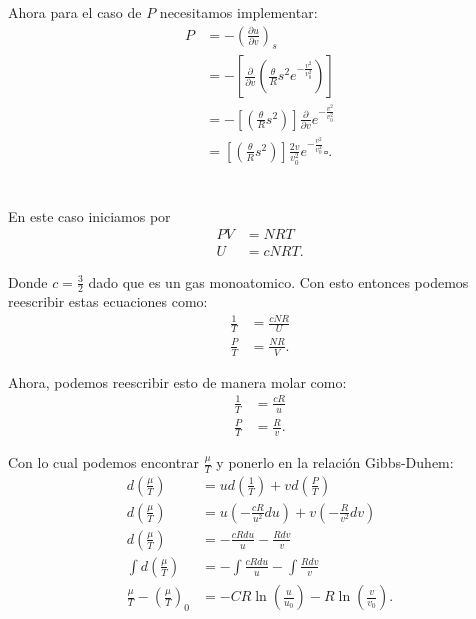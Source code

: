 \documentclass{report}
\begin{document}
Ahora para el caso de $P$ necesitamos implementar:
\begin{align*}
  P &= - \left( \frac{\partial u}{\partial v} \right)_s \\
  &= - \left[ \frac{\partial}{\partial v} \left( \frac{\theta}{R} s^2 e^{- \frac{v^2}{v_0^2}} \right) \right]\\
  &= - \left[ \left( \frac{\theta}{R} s^2 \right) \right]\frac{\partial}{\partial v} e^{- \frac{v^2}{v_0^2}}\\
  &= \left[ \left( \frac{\theta}{R} s^2 \right) \right]\frac{2v}{v_0^2} e^{- \frac{v^2}{v_0^2}} \square.
\end{align*}

\chapter{}

\section{}

En este caso iniciamos por
\begin{align*}
  PV &= NRT \\
  U &= cNRT
.\end{align*}

Donde $c = \frac{3}{2}$ dado que es un gas monoatomico. Con esto entonces podemos reescribir estas ecuaciones como:
\begin{align*}
  \frac{1}{T} &= \frac{c NR}{U} \\
  \frac{P}{T} &= \frac{NR}{V}
.\end{align*}

Ahora, podemos reescribir esto de manera molar como:
\begin{align*}
  \frac{1}{T} &= \frac{cR}{u} \\
  \frac{P}{T} &= \frac{R}{v}
.\end{align*}

Con lo cual podemos encontrar $\frac{\mu}{T}$ y ponerlo en la relación Gibbs-Duhem:
\begin{align*}
  d \left( \frac{\mu}{T} \right) &= u d\left( \frac{1}{T} \right) + v d\left( \frac{P}{T} \right)  \\
  d \left( \frac{\mu}{T} \right) &= u \left( - \frac{cR}{u^2}du \right) + v \left( - \frac{R}{v^2}dv \right)  \\
  d\left( \frac{\mu}{T} \right) &= - \frac{cR du}{u} - \frac{Rdv}{v} \\
  \int d\left( \frac{\mu}{T} \right) &= - \int \frac{cR du}{u} -\int \frac{Rdv}{v} \\
  \frac{\mu}{T} - \left( \frac{\mu}{T} \right)_{0} &= - CR \ln\left( \frac{u}{u_0} \right)  - R \ln\left( \frac{v}{v_0} \right)
.\end{align*}
\end{document}
